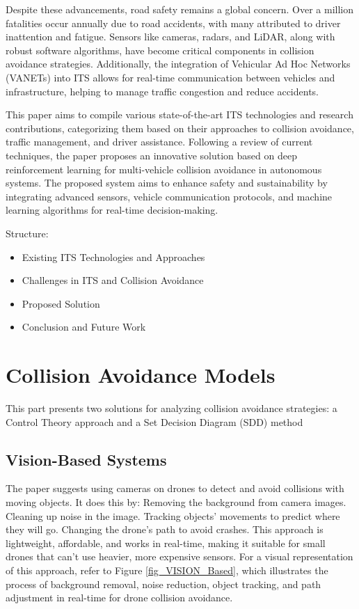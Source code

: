 \documentclass[12pt,twocolumn]{article}
\begin{document}
Despite these advancements, road safety remains a global concern. Over a million fatalities occur annually due to road accidents, with many attributed to driver inattention and fatigue. Sensors like cameras, radars, and LiDAR, along with robust software algorithms, have become critical components in collision avoidance strategies. Additionally, the integration of Vehicular Ad Hoc Networks (VANETs) into ITS allows for real-time communication between vehicles and infrastructure, helping to manage traffic congestion and reduce accidents.

This paper aims to compile various state-of-the-art ITS technologies and research contributions, categorizing them based on their approaches to collision avoidance, traffic management, and driver assistance. Following a review of current techniques, the paper proposes an innovative solution based on deep reinforcement learning for multi-vehicle collision avoidance in autonomous systems. The proposed system aims to enhance safety and sustainability by integrating advanced sensors, vehicle communication protocols, and machine learning algorithms for real-time decision-making.

Structure:
\begin{itemize}
\item Existing ITS Technologies and Approaches
\item Challenges in ITS and Collision Avoidance
\item Proposed Solution
\item Conclusion and Future Work
\end{itemize}

\section{Collision Avoidance Models}
This part presents two solutions for analyzing collision avoidance strategies: a Control Theory approach and a Set Decision Diagram (SDD) method

\subsection{Vision-Based Systems}

The paper suggests using cameras on drones to detect and avoid collisions with moving objects. It does this by:
Removing the background from camera images.
Cleaning up noise in the image.
Tracking objects' movements to predict where they will go.
Changing the drone's path to avoid crashes.
This approach is lightweight, affordable, and works in real-time, making it suitable for small drones that can't use heavier, more expensive sensors.
For a visual representation of this approach, refer to Figure \ref{fig_VISION_Based}, which illustrates the process of background removal, noise reduction, object tracking, and path adjustment in real-time for drone collision avoidance.
\end{document}
